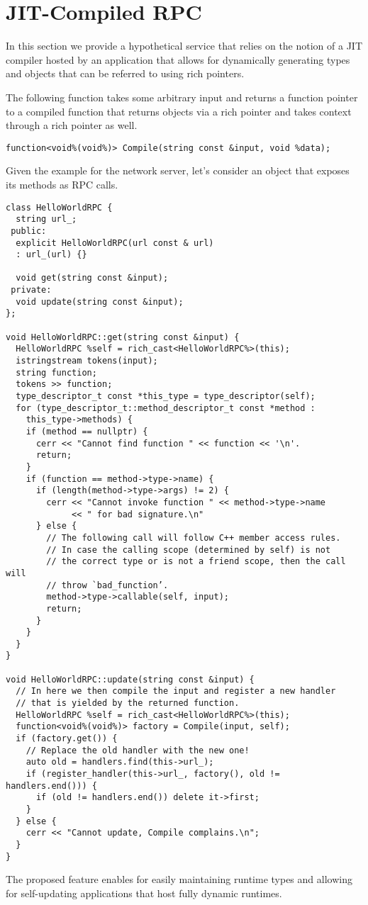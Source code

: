 \section{JIT-Compiled RPC}
\label{appendix:jit-rpc-example}
In this section we provide a hypothetical service that relies on the
notion of a JIT compiler hosted by an application that allows for dynamically
generating types and objects that can be referred to using rich pointers.

The following function takes some arbitrary input and returns a function pointer
to a compiled function that returns objects via a rich pointer and takes context
through a rich pointer as well.

\begin{verbatim}
function<void%(void%)> Compile(string const &input, void %data);
\end{verbatim}

Given the example for the network server, let’s consider an object
that exposes its methods as RPC calls.
\begin{verbatim}
class HelloWorldRPC {
  string url_;
 public:
  explicit HelloWorldRPC(url const & url)
  : url_(url) {}

  void get(string const &input);
 private:
  void update(string const &input);
};

void HelloWorldRPC::get(string const &input) {
  HelloWorldRPC %self = rich_cast<HelloWorldRPC%>(this);
  istringstream tokens(input);
  string function;
  tokens >> function;
  type_descriptor_t const *this_type = type_descriptor(self);
  for (type_descriptor_t::method_descriptor_t const *method :
    this_type->methods) {
    if (method == nullptr) {
      cerr << "Cannot find function " << function << '\n'.
      return;
    }
    if (function == method->type->name) {
      if (length(method->type->args) != 2) {
        cerr << "Cannot invoke function " << method->type->name
             << " for bad signature.\n"
      } else {
        // The following call will follow C++ member access rules.
        // In case the calling scope (determined by self) is not
        // the correct type or is not a friend scope, then the call will
        // throw `bad_function’.
        method->type->callable(self, input);
        return;
      }
    }
  }
}

void HelloWorldRPC::update(string const &input) {
  // In here we then compile the input and register a new handler
  // that is yielded by the returned function.
  HelloWorldRPC %self = rich_cast<HelloWorldRPC%>(this);
  function<void%(void%)> factory = Compile(input, self);
  if (factory.get()) {
    // Replace the old handler with the new one!
    auto old = handlers.find(this->url_);
    if (register_handler(this->url_, factory(), old != handlers.end())) {
      if (old != handlers.end()) delete it->first;
    }
  } else {
    cerr << "Cannot update, Compile complains.\n";
  }
}
\end{verbatim}

The proposed feature enables for easily maintaining runtime types and allowing
for self-updating applications that host fully dynamic runtimes.
